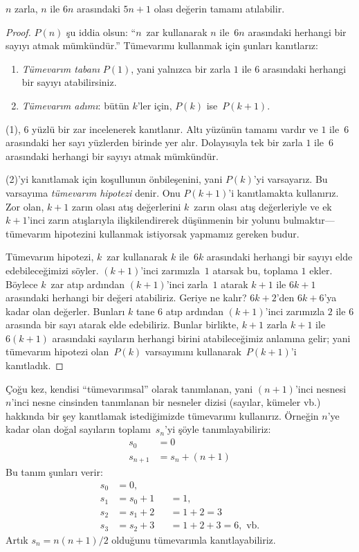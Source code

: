 \documentclass[../../../include/open-logic-section]{subfiles}
\begin{document}
\begin{thm}
  $n$ zarla, $n$ ile $6n$ arasındaki $5n+1$ olası değerin tamamı
  atılabilir.
\end{thm}

\begin{proof}
$P(n)$ şu iddia olsun: ``$n$~zar kullanarak $n$ ile~$6n$ arasındaki
herhangi bir sayıyı atmak mümkündür.'' Tümevarımı kullanmak için şunları
kanıtlarız:
\begin{enumerate}
\item \emph{Tümevarım tabanı} $P(1)$, yani yalnızca bir zarla $1$ ile
  $6$ arasındaki herhangi bir sayıyı atabilirsiniz.
\item \emph{Tümevarım adımı}: bütün $k$'ler için, $P(k)$ ise~$P(k+1)$.
\end{enumerate}

(1), $6$ yüzlü bir zar incelenerek kanıtlanır. Altı yüzünün tamamı
vardır ve $1$ ile~$6$ arasındaki her sayı yüzlerden birinde yer alır.
Dolayısıyla tek bir zarla $1$ ile~$6$ arasındaki herhangi bir sayıyı
atmak mümkündür.

(2)'yi kanıtlamak için koşullunun önbileşenini, yani $P(k)$'yi
varsayarız. Bu varsayıma \emph{tümevarım hipotezi} denir. Onu $P(k+1)$'i
kanıtlamakta kullanırız. Zor olan, $k+1$ zarın olası atış değerlerini
  $k$~zarın olası atış değerleriyle ve ek $k+1$'inci zarın atışlarıyla
ilişkilendirerek düşünmenin bir yolunu bulmaktır---tümevarım hipotezini
kullanmak istiyorsak yapmamız gereken budur.

Tümevarım hipotezi, $k$~zar kullanarak $k$ ile~$6k$ arasındaki herhangi
bir sayıyı elde edebileceğimizi söyler. $(k+1)$'inci zarımızla~$1$
atarsak bu, toplama $1$ ekler. Böylece $k$~zar atıp ardından
$(k+1)$'inci zarla~$1$ atarak $k+1$ ile $6k+1$ arasındaki herhangi bir
değeri atabiliriz. Geriye ne kalır? $6k+2$'den $6k+6$'ya kadar olan
değerler. Bunları $k$ tane $6$ atıp ardından $(k+1)$'inci zarımızla $2$
ile $6$ arasında bir sayı atarak elde edebiliriz. Bunlar birlikte,
$k+1$ zarla $k+1$ ile $6(k+1)$ arasındaki sayıların herhangi birini
atabileceğimiz anlamına gelir; yani tümevarım hipotezi olan~$P(k)$
varsayımını kullanarak~$P(k+1)$'i kanıtladık.
\end{proof}

Çoğu kez, kendisi ``tümevarımsal'' olarak tanımlanan, yani $(n+1)$'inci
nesnesi $n$'inci nesne cinsinden tanımlanan bir nesneler dizisi
(sayılar, kümeler vb.) hakkında bir şey kanıtlamak istediğimizde
tümevarımı kullanırız. Örneğin $n$'ye kadar olan doğal sayıların
toplamı~$s_n$'yi şöyle tanımlayabiliriz:
\begin{align*}
  s_0 & = 0\\
  s_{n+1} & = s_n + (n+1)
\end{align*}
Bu tanım şunları verir:
\begin{align*}
  s_0 & = 0,\\
  s_1 & = s_0 + 1 && = 1,\\
  s_2 & = s_1 + 2 && = 1 + 2 = 3\\
  s_3 & = s_2 + 3 && = 1 + 2 + 3 = 6, \text{ vb.}
\end{align*}
Artık $s_n = n(n+1)/2$ olduğunu tümevarımla kanıtlayabiliriz.
\end{document}
